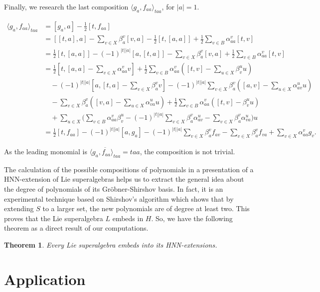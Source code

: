 \documentclass[reqno]{amsart}
\newtheorem{theorem}{Theorem}[section]
\theoremstyle{definition}
\theoremstyle{remark}
\numberwithin{equation}{section}
\begin{document}
Finally, we research the last composition $\langle g_a,f_{aa}\rangle_{taa}$, for $|a|=1$.

\begin{align*}
\langle g_a,f_{aa}\rangle_{taa}&=[g_a,a]-\frac{1}{2}[t,f_{aa}] \\
&=[[t,a],a]-\sum_{v\in X}\beta_a^v[v,a]-\frac{1}{2}[t,[a,a]]+\frac{1}{2}\sum_{v\in B}\alpha_{aa}^v[t,v] \\
&=\frac{1}{2}[t,[a,a]]-(-1)^{|t||a|}[a,[t,a]]-\sum_{v\in X}\beta_a^v[v,a]+\frac{1}{2}\sum_{v\in B}\alpha_{aa}^v[t,v] \\
&=\frac{1}{2}[t,[a,a]-\sum_{v\in X}\alpha_{aa}^vv]+\frac{1}{2}\sum_{v\in B}\alpha_{aa}^v([t,v]-\sum_{u\in X}\beta_{v}^{u}u) \\
&\quad -(-1)^{|t||a|}[a,[t,a]-\sum_{v\in X}\beta_{a}^vv]-(-1)^{|t||a|}\sum_{v\in X}\beta_{a}^v([a,v]-\sum_{u\in X}\alpha_{av}^{u}u)  \\
&\quad -\sum_{v\in X}\beta_a^v([v,a]-\sum_{u\in X}\alpha_{va}^uu)+\frac{1}{2}\sum_{v\in B}\alpha_{aa}^v([t,v]-\beta_{v}^uu) \\
&\quad +\sum_{u\in X}\Big(\sum_{v\in B}\alpha_{aa}^v\beta_{v}^{u}-(-1)^{|t||a|}\sum_{v\in X}\beta_{a}^v\alpha_{av}^{u}-\sum_{v\in X}\beta_a^v\alpha_{va}^u\Big)u \\
&=\frac{1}{2}[t,f_{aa}]-(-1)^{|t||a|}[a,g_a]-(-1)^{|t||a|}\sum_{v\in X}\beta_a^vf_{av}-\sum_{v\in X}\beta_a^vf_{va}+\sum_{v\in X}\alpha_{aa}^vg_{v}.
\end{align*}

As the leading monomial is $\overline{\langle g_a,f_{aa}\rangle_{taa}}=taa$, the composition is not trivial.

The calculation of the possible compositions of polynomials in a presentation of a HNN-extension of Lie superalgebras helps us to extract the general idea about the degree of polynomials of its Gr\"obner-Shirshov basis. In fact, it is an experimental technique based on Shirshov's algorithm \cite{S1} which shows that by extending $S$ to a larger set, the new polynomials are of degree at least two. This proves that the Lie superalgebra $L$ embeds in $H$. So, we have the following theorem as a direct result of our computations.
\begin{theorem}
Every Lie superalgebra embeds into its HNN-extensions.
\end{theorem}

\section{Application} \label{S:app}
\end{document}
